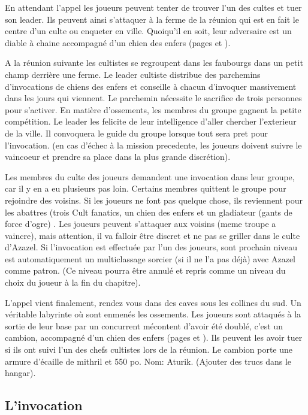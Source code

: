 En attendant l'appel les joueurs peuvent tenter de trouver l'un des cultes et tuer son 
leader. Ils peuvent ainsi s'attaquer à la ferme de la réunion qui est en fait le centre
d'un culte ou enqueter en ville. Quoiqu'il en soit, leur adversaire est un diable à 
chaine accompagné d'un chien des enfers (pages \pageref{DiableChaine} et \pageref{ChienEnfers}).

A la réunion suivante les cultistes se regroupent dans les faubourgs dans un petit champ
derrière une ferme. Le leader cultiste distribue des parchemins d'invocations de chiens 
des enfers et conseille à chacun d'invoquer massivement dans les jours qui viennent.
Le parchemin nécessite le sacrifice de trois personnes pour s'activer. En matière 
d'ossements, les membres du groupe gagnent la petite compétition. Le leader
les felicite de leur intelligence d'aller chercher l'exterieur de la ville. Il 
convoquera le guide du groupe lorsque tout sera pret pour l'invocation. (en cas d'échec
à la mission precedente, les joueurs doivent suivre le vaincoeur et prendre
sa place dans la plus grande discrétion).

Les membres du culte des joueurs demandent une invocation dans leur groupe, car il y
en a eu plusieurs pas loin. Certains membres quittent le groupe pour rejoindre
des voisins. Si les joueurs ne font pas quelque chose, ils reviennent pour les
abattres (trois Cult fanatics, un chien des enfers et un gladiateur 
(gants de force d'ogre) . Les joueurs 
peuvent s'attaquer aux voisins (meme troupe a vaincre), mais attention, il va falloir 
être discret et ne pas se griller dans le culte d'Azazel. Si l'invocation est 
effectuée par l'un des joueurs, sont prochain niveau est automatiquement un 
multiclassage sorcier (si il ne l'a pas déjà) avec Azazel comme patron. (Ce niveau 
pourra être annulé et repris comme un niveau du choix du joueur à la fin du chapitre).

L'appel vient finalement, rendez vous dans des caves sous les collines du sud.
Un véritable labyrinte où sont enmenés les ossements. Les joueurs sont attaqués
à la sortie de leur base par un concurrent mécontent d'avoir été doublé, c'est
un cambion, accompagné d'un chien des enfers (pages \pageref{Cambion} et \pageref{ChienEnfers}).
Ils peuvent les avoir tuer si ils ont suivi l'un des chefs cultistes lors de la 
réunion. Le cambion porte une armure d'écaille de mithril et 550 po. Nom: Aturik.
(Ajouter des trucs dans le hangar).

\subsection*{L'invocation}

